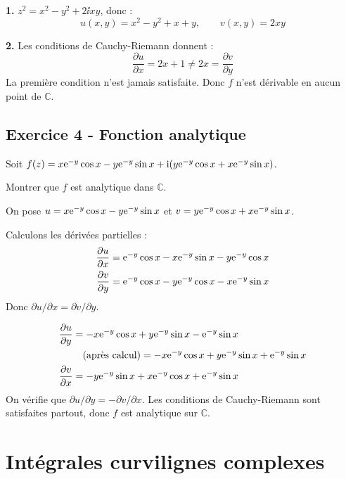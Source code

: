 \documentclass[12pt,a4paper]{article}
\begin{document}
\begin{boitecorrige}
\textbf{1.} $z^2 = x^2-y^2+2\ii xy$, donc :
\[
u(x,y) = x^2-y^2+x+y, \qquad v(x,y) = 2xy
\]

\textbf{2.} Les conditions de Cauchy-Riemann donnent :
\[
\frac{\partial u}{\partial x} = 2x+1 \neq 2x = \frac{\partial v}{\partial y}
\]
La première condition n'est jamais satisfaite. Donc $f$ n'est dérivable en aucun point de $\mathbb{C}$.
\end{boitecorrige}

\subsection*{Exercice 4 - Fonction analytique \niveau{\moyen}}

\begin{boiteexercice}
Soit $f(z) = x\mathrm{e}^{-y}\cos x - y\mathrm{e}^{-y}\sin x + \mathrm{i}(y\mathrm{e}^{-y}\cos x + x\mathrm{e}^{-y}\sin x)$.

Montrer que $f$ est analytique dans $\mathbb{C}$.
\end{boiteexercice}

\begin{boitecorrige}
On pose $u = x\mathrm{e}^{-y}\cos x - y\mathrm{e}^{-y}\sin x$ et $v = y\mathrm{e}^{-y}\cos x + x\mathrm{e}^{-y}\sin x$.

Calculons les dérivées partielles :
\begin{align*}
\frac{\partial u}{\partial x} &= \mathrm{e}^{-y}\cos x - x\mathrm{e}^{-y}\sin x - y\mathrm{e}^{-y}\cos x \\
\frac{\partial v}{\partial y} &= \mathrm{e}^{-y}\cos x - y\mathrm{e}^{-y}\cos x - x\mathrm{e}^{-y}\sin x
\end{align*}
Donc $\partial u/\partial x = \partial v/\partial y$.

\begin{align*}
\frac{\partial u}{\partial y} &= -x\mathrm{e}^{-y}\cos x + y\mathrm{e}^{-y}\sin x - \mathrm{e}^{-y}\sin x \\
  &\quad \text{(après calcul)} = -x\mathrm{e}^{-y}\cos x + y\mathrm{e}^{-y}\sin x + \mathrm{e}^{-y}\sin x \\
\frac{\partial v}{\partial x} &= -y\mathrm{e}^{-y}\sin x + x\mathrm{e}^{-y}\cos x + \mathrm{e}^{-y}\sin x
\end{align*}
On vérifie que $\partial u/\partial y = -\partial v/\partial x$. Les conditions de Cauchy-Riemann sont satisfaites partout, donc $f$ est analytique sur $\mathbb{C}$.
\end{boitecorrige}

\section{Intégrales curvilignes complexes}
\end{document}
